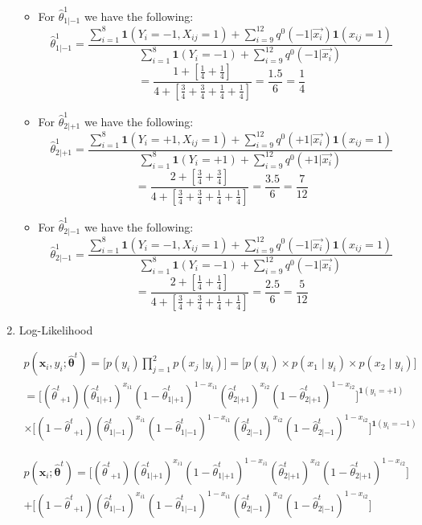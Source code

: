 \documentclass[english]{article}
\begin{document}
\begin{enumerate}
\begin{itemize}
\item For $\hat{\theta}^1_{1|-1}$ we have the following:
$$\hat{\theta}^1_{1|-1} = \frac{\sum_{i=1}^{8} \mathbf{1}(Y_i = -1, X_{ij} = 1) + \sum_{i=9}^{12}q^0(-1 | \vec{x_i})\mathbf{1}(x_{ij} = 1)}{\sum_{i=1}^{8} \mathbf{1}(Y_i = -1) + \sum_{i=9}^{12}q^0(-1 | \vec{x_i})}$$
$$ = \frac{1 + [\frac{1}{4} + \frac{1}{4}]}{4 + [\frac{3}{4} + \frac{3}{4} + \frac{1}{4} + \frac{1}{4}]} = \frac{1.5}{6} = \frac{1}{4}$$

\item For $\hat{\theta}^1_{2|+1}$ we have the following: 
$$\hat{\theta}^1_{2|+1} = \frac{\sum_{i=1}^{8} \mathbf{1}(Y_i = +1, X_{ij} = 1) + \sum_{i=9}^{12}q^0(+1 | \vec{x_i})\mathbf{1}(x_{ij} = 1)}{\sum_{i=1}^{8} \mathbf{1}(Y_i = +1) + \sum_{i=9}^{12}q^0(+1 | \vec{x_i})}$$
$$ = \frac{2 + [\frac{3}{4} + \frac{3}{4}]}{4 + [\frac{3}{4} + \frac{3}{4} + \frac{1}{4} + \frac{1}{4}]} = \frac{3.5}{6} = \frac{7}{12}$$

\item For $\hat{\theta}^1_{2|-1}$ we have the following:
$$\hat{\theta}^1_{2|-1} = \frac{\sum_{i=1}^{8} \mathbf{1}(Y_i = -1, X_{ij} = 1) + \sum_{i=9}^{12}q^0(-1 | \vec{x_i})\mathbf{1}(x_{ij} = 1)}{\sum_{i=1}^{8} \mathbf{1}(Y_i = -1) + \sum_{i=9}^{12}q^0(-1 | \vec{x_i})}$$
$$ = \frac{2 + [\frac{1}{4} + \frac{1}{4}]}{4 + [\frac{3}{4} + \frac{3}{4} + \frac{1}{4} + \frac{1}{4}]} = \frac{2.5}{6} = \frac{5}{12}$$
\end{itemize}

\item Log-Likelihood

\begin{multline*}
p(\mathbf{x}_i,y_i;\bm{\hat{\theta}}^t) = \bigg[ p(y_i) \prod_{j = 1}^2 p(x_j \; | y_i)\bigg] = \big[ p(y_i) \times p(x_1 \; | \; y_i) \times p(x_2 \; | \; y_i) \big] \\
= \bigg[({\hat{\theta}^t}_{+1}) ({\hat{\theta}_{1|+1}^t})^{x_{i1}}  (1-{\hat{\theta}_{1|+1}^t})^{1-x_{i1}} ({\hat{\theta}_{2|+1}^t})^{x_{i2}}  (1-{\hat{\theta}_{2|+1}^t})^{1-x_{i2}}\bigg]^{{\bm{1}(y_i=+1)}} \\
\times \bigg[(1-{\hat{\theta}^t}_{+1}) ({\hat{\theta}_{1|-1}^t})^{x_{i1}}  (1-{\hat{\theta}_{1|-1}^t})^{1-x_{i1}} ({\hat{\theta}_{2|-1}^t})^{x_{i2}}  (1-{\hat{\theta}_{2|-1}^t})^{1-x_{i2}}\bigg]^{{\bm{1}(y_i=-1)}} 
\end{multline*}

\begin{multline*}
p(\mathbf{x}_i;\bm{\hat{\theta}}^t) = \bigg[({\hat{\theta}^t}_{+1}) ({\hat{\theta}_{1|+1}^t})^{x_{i1}}  (1-{\hat{\theta}_{1|+1}^t})^{1-x_{i1}} ({\hat{\theta}_{2|+1}^t})^{x_{i2}}  (1-{\hat{\theta}_{2|+1}^t})^{1-x_{i2}}\bigg] \\
+ \bigg[(1-{\hat{\theta}^t}_{+1}) ({\hat{\theta}_{1|-1}^t})^{x_{i1}}  (1-{\hat{\theta}_{1|-1}^t})^{1-x_{i1}} ({\hat{\theta}_{2|-1}^t})^{x_{i2}}  (1-{\hat{\theta}_{2|-1}^t})^{1-x_{i2}}\bigg] 
\end{multline*}



\end{enumerate}
\end{document}
